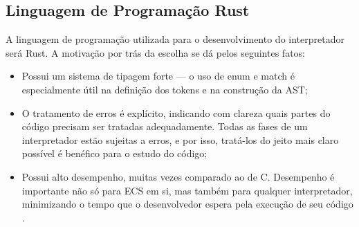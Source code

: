 \subsection{Linguagem de Programação Rust}

A linguagem de programação utilizada para o desenvolvimento do interpretador será Rust. A motivação por trás da escolha se dá pelos seguintes fatos:

\begin{itemize}
    \item Possui um sistema de tipagem forte — o uso de enum e match é especialmente útil na definição dos tokens e na construção da AST;
    \item O tratamento de erros é explícito, indicando com clareza quais partes do código precisam ser tratadas adequadamente. Todas as fases de um interpretador estão sujeitas a erros, e por isso, tratá-los do jeito mais claro possível é benéfico para o estudo do código;
    \item Possui alto desempenho, muitas vezes comparado ao de C. Desempenho é importante não só para ECS em si, mas também para qualquer interpretador, minimizando o tempo que o desenvolvedor espera pela execução de seu código \cite{rustbook}.
\end{itemize}
